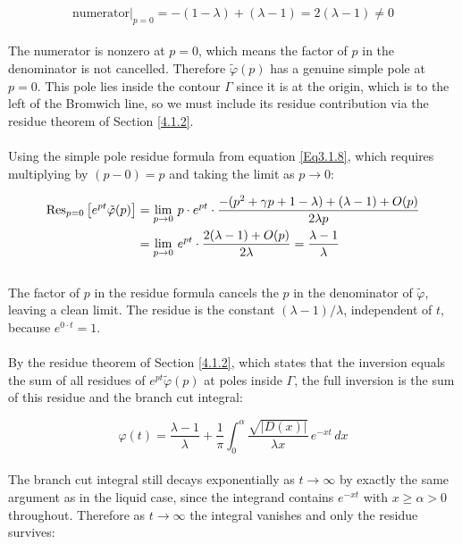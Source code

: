 \begin{equation}
    \text{numerator}\big|_{p=0} = -(1-\lambda) + (\lambda-1) = 
    2(\lambda-1) \neq 0
\end{equation}
\\
The numerator is nonzero at $p = 0$, which means the factor of $p$ in the 
denominator is not cancelled. Therefore $\tilde{\varphi}(p)$ has a genuine 
simple pole at $p = 0$. This pole lies inside the contour $\Gamma$ 
since it is at the origin, which is to the left of the Bromwich line, so we 
must include its residue contribution via the residue theorem of Section \ref{4.1.2}.
\\
\\
Using the simple pole residue formula from equation \eqref{Eq3.1.8}, 
which requires multiplying by $(p - 0) = p$ and taking the limit as $p \to 0$:

\begin{align}
    \operatorname{Res}_{p=0}\left[e^{pt}\tilde{\varphi}(p)\right] 
    &= \lim_{p \to 0}\, p \cdot e^{pt} \cdot 
    \frac{-(p^2+\gamma p+1-\lambda)+(\lambda-1)+O(p)}{2\lambda p} \notag \\
    &= \lim_{p \to 0}\, e^{pt} \cdot 
    \frac{2(\lambda-1) + O(p)}{2\lambda} = \frac{\lambda - 1}{\lambda}
\end{align}
\\
The factor of $p$ in the residue formula cancels the $p$ in the denominator of 
$\tilde{\varphi}$, leaving a clean limit. The residue is the constant 
$(\lambda-1)/\lambda$, independent of $t$, because $e^{0 \cdot t} = 1$.
\\
\\
By the residue theorem of Section \ref{4.1.2}, which states that the inversion equals 
the sum of all residues of $e^{pt}\tilde{\varphi}(p)$ at poles inside $\Gamma$, 
the full inversion is the sum of this residue and the branch cut integral:

\begin{equation}
    \varphi(t) = \frac{\lambda - 1}{\lambda} + 
    \frac{1}{\pi}\int_0^{\alpha}\frac{\sqrt{|D(x)|}}{\lambda x}\,e^{-xt}\, dx
\end{equation}
\\
The branch cut integral still decays exponentially as $t \to \infty$ by exactly 
the same argument as in the liquid case, since the integrand contains $e^{-xt}$ 
with $x \geq \alpha > 0$ throughout. Therefore as $t \to \infty$ the integral 
vanishes and only the residue survives:

